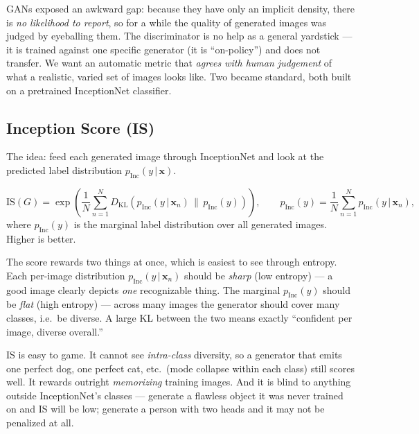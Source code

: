 \documentclass[11pt, oneside]{book}
\newcommand{\KL}[2]{D_{\mathrm{KL}}\!\left(#1 \,\|\, #2\right)}
\newcommand{\xvec}{\mathbf{x}}
\newcommand{\given}{\,\vert\,}
\begin{document}
GANs exposed an awkward gap: because they have only an implicit density, there is
\emph{no likelihood to report}, so for a while the quality of generated images was
judged by eyeballing them. The discriminator is no help as a general yardstick ---
it is trained against one specific generator (it is ``on-policy'') and does not
transfer. We want an automatic metric that \emph{agrees with human judgement} of
what a realistic, varied set of images looks like. Two became standard, both built
on a pretrained InceptionNet classifier.

\subsection{Inception Score (IS)}

The idea: feed each generated image through InceptionNet and look at the predicted
label distribution $p_{\mathrm{Inc}}(y\given\xvec)$.

\begin{thmbox}[title={Inception Score}]
\[
  \mathrm{IS}(G) = \exp\!\left(\frac1N \sum_{n=1}^{N}
    \KL{p_{\mathrm{Inc}}(y \given \xvec_n)}{p_{\mathrm{Inc}}(y)}\right),
  \qquad
  p_{\mathrm{Inc}}(y) = \frac1N \sum_{n=1}^{N} p_{\mathrm{Inc}}(y\given\xvec_n),
\]
where $p_{\mathrm{Inc}}(y)$ is the marginal label distribution over all generated
images. Higher is better.
\end{thmbox}

The score rewards two things at once, which is easiest to see through entropy.
Each per-image distribution $p_{\mathrm{Inc}}(y\given\xvec_n)$ should be
\emph{sharp} (low entropy) --- a good image clearly depicts \emph{one}
recognizable thing. The marginal $p_{\mathrm{Inc}}(y)$ should be \emph{flat} (high
entropy) --- across many images the generator should cover many classes, i.e.\ be
diverse. A large KL between the two means exactly ``confident per image, diverse
overall.''

\begin{notebox}[title={Why IS is not enough}]
IS is easy to game. It cannot see \emph{intra-class} diversity, so a generator that
emits one perfect dog, one perfect cat, etc.\ (mode collapse within each class)
still scores well. It rewards outright \emph{memorizing} training images. And it is
blind to anything outside InceptionNet's classes --- generate a flawless object
it was never trained on and IS will be low; generate a person with two heads and it
may not be penalized at all.
\end{notebox}
\end{document}
